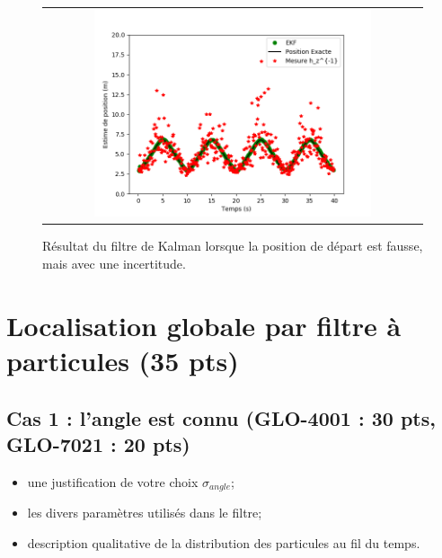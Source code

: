 \documentclass[12pt]{article}
\begin{document}
\begin{figure}[ht]
 \begin{center}
  \begin{tabular}{c}
    \includegraphics[width=0.75\textwidth]{fig/kalman-position-err-incertitude.png}
  \end{tabular}
 \end{center}
\vspace{-0.25in}
    \caption{Résultat du filtre de Kalman lorsque la position de départ est fausse, mais avec une incertitude.}
    \label{kalman-position-exacte-incertitude}
\end{figure}


\section {Localisation globale par filtre à particules (35 pts)}

\subsection{Cas 1 : l'angle est connu (GLO-4001 : 30 pts, GLO-7021 : 20 pts)}

\begin{itemize}
\item une justification de votre choix $\sigma_{angle}$;
\item les divers paramètres utilisés dans le filtre;
\item description qualitative de la distribution des particules au fil du temps.
\end{itemize}
\end{document}
